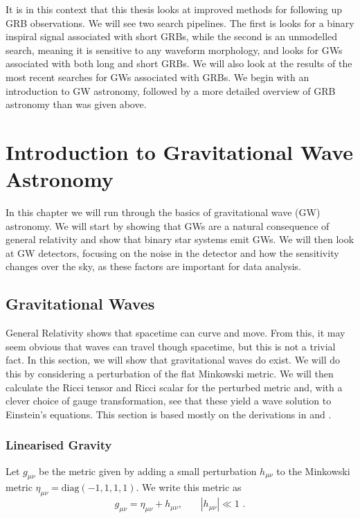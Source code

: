 \documentclass[11pt]{cuthesis}
\newcommand{\mn}{_{\mu\nu}}
\begin{document}
It is in this context that this thesis looks at improved methods for following up GRB observations. We will see two search pipelines. The first is looks for a binary inspiral signal associated with short GRBs, while the second is an unmodelled search, meaning it is sensitive to any waveform morphology, and looks for GWs associated with both long and short GRBs. We will also look at the results of the most recent searches for GWs associated with GRBs. We begin with an introduction to GW astronomy, followed by a more detailed overview of GRB astronomy than was given above. 


\chapter{Introduction to Gravitational Wave Astronomy} \label{chap: gw bg}
In this chapter we will run through the basics of gravitational wave (GW) astronomy. We will start by showing that GWs are a natural consequence of general relativity and show that binary star systems emit GWs. We will then look at GW detectors, focusing on the noise in the detector and how the sensitivity changes over the sky, as these factors are important for data analysis.


\section{Gravitational Waves}
General Relativity shows that spacetime can curve and move. From this, it may seem obvious that waves can travel though spacetime, but this is not a trivial fact. In this section, we will show that gravitational waves do exist. We will do this by considering a perturbation of the flat Minkowski metric. We will then calculate the Ricci tensor and Ricci scalar for the perturbed metric and, with a clever choice of gauge transformation, see that these yield a wave solution to Einstein's equations. This section is based mostly on the derivations in \cite{zee-einstein} and \cite{carroll-spacetime}. 

\subsection{Linearised Gravity}
Let $g\mn$ be the metric given by adding a small perturbation $h_{\mu\nu}$ to the Minkowski metric $\eta\mn=\text{diag}(-1,1,1,1)$. We write this metric as 
\begin{equation} \label{pert metric}
g\mn=\eta_{\mu\nu}+h_{\mu\nu} \text{, } \hspace{20pt} |h_{\mu\nu}| \ll 1 \text{ .}
\end{equation}
\end{document}
